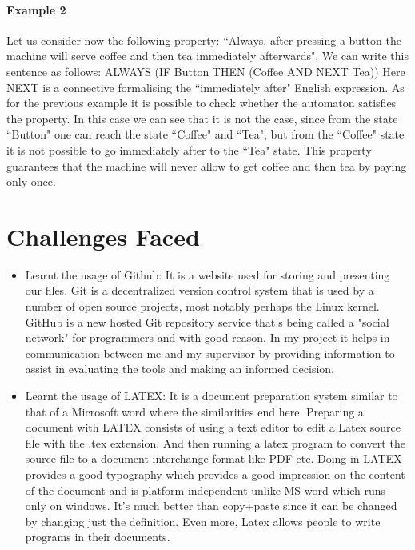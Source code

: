 \documentclass[a4paper,12pt]{extarticle}
\begin{document}
\paragraph{Example 2}
Let us consider now the following property: ``Always, after pressing a button the machine will serve coffee and then tea immediately afterwards". We can write this sentence as follows:
ALWAYS (IF Button THEN (Coffee AND NEXT Tea))
Here NEXT is a connective formalising the ``immediately after" English expression. As for the previous example it is possible to check whether the automaton satisfies the property. In this case we can see that it is not the case, since from the state ``Button" one can reach the state ``Coffee" and ``Tea", but from the ``Coffee" state it is not possible to go immediately after to the ``Tea" state. This property guarantees that the machine will never allow to get coffee and then tea by paying only once.
\section{Challenges Faced}
\label{challenge face}
\begin{itemize}
\item Learnt the usage of Github: It is a website used for storing and presenting our files. Git is a decentralized version control system that is used by a number of open source projects, most notably perhaps the Linux kernel. GitHub is a new hosted Git repository service that's being called a "social network" for programmers and with good reason. In my project it helps in communication between me and my supervisor by providing information to assist in evaluating the tools and making an informed decision.
\item Learnt the usage of LATEX: It is a document preparation system similar to that of a Microsoft word where the similarities end here. Preparing a document with LATEX consists of using a text editor to edit a Latex source file with the .tex extension. And then running a latex program to convert the source file to a document interchange format like PDF etc. Doing in LATEX provides a good typography which provides a good impression on the content of the document and is platform independent unlike MS word which runs only on windows. It's much better than copy+paste since it can be changed by changing just the definition. Even more, Latex allows people to write programs in their documents.
\end{itemize}
\end{document}
